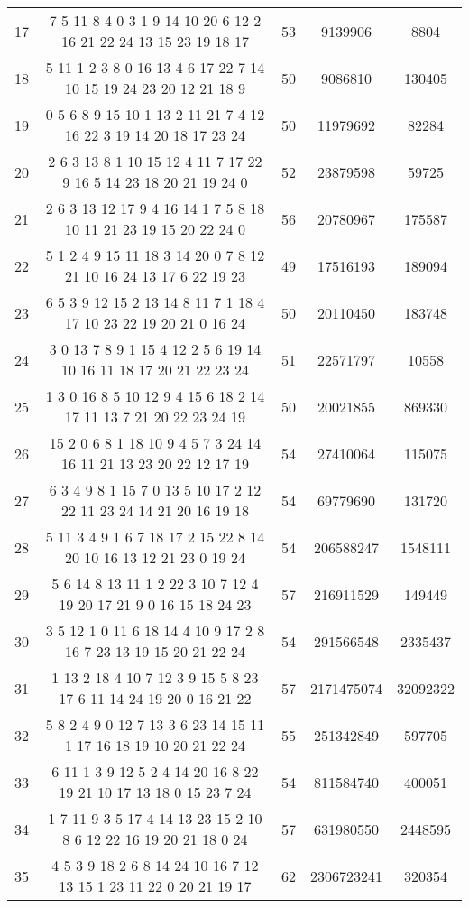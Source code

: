 \documentclass[a4paper,11pt,oneside,openany]{jsbook}
\begin{document}
\begin{table}[]
{\begin{tabular}{|c|c|c|c|c|}
17 & 7 5 11 8 4 0 3 1 9 14 10 20 6 12 2 16 21 22 24 13 15 23 19 18 17  & 53 & 9139906 & 8804 \\
18 & 5 11 1 2 3 8 0 16 13 4 6 17 22 7 14 10 15 19 24 23 20 12 21 18 9  & 50 & 9086810 & 130405 \\
19 & 0 5 6 8 9 15 10 1 13 2 11 21 7 4 12 16 22 3 19 14 20 18 17 23 24  & 50 & 11979692 & 82284 \\
20 & 2 6 3 13 8 1 10 15 12 4 11 7 17 22 9 16 5 14 23 18 20 21 19 24 0  & 52 & 23879598 & 59725 \\
21 & 2 6 3 13 12 17 9 4 16 14 1 7 5 8 18 10 11 21 23 19 15 20 22 24 0  & 56 & 20780967 & 175587 \\
22 & 5 1 2 4 9 15 11 18 3 14 20 0 7 8 12 21 10 16 24 13 17 6 22 19 23  & 49 & 17516193 & 189094 \\
23 & 6 5 3 9 12 15 2 13 14 8 11 7 1 18 4 17 10 23 22 19 20 21 0 16 24  & 50 & 20110450 & 183748 \\
24 & 3 0 13 7 8 9 1 15 4 12 2 5 6 19 14 10 16 11 18 17 20 21 22 23 24  & 51 & 22571797 & 10558 \\
25 & 1 3 0 16 8 5 10 12 9 4 15 6 18 2 14 17 11 13 7 21 20 22 23 24 19  & 50 & 20021855 & 869330 \\
26 & 15 2 0 6 8 1 18 10 9 4 5 7 3 24 14 16 11 21 13 23 20 22 12 17 19  & 54 & 27410064 & 115075 \\
27 & 6 3 4 9 8 1 15 7 0 13 5 10 17 2 12 22 11 23 24 14 21 20 16 19 18  & 54 & 69779690 & 131720 \\
28 & 5 11 3 4 9 1 6 7 18 17 2 15 22 8 14 20 10 16 13 12 21 23 0 19 24  & 54 & 206588247 & 1548111 \\
29 & 5 6 14 8 13 11 1 2 22 3 10 7 12 4 19 20 17 21 9 0 16 15 18 24 23  & 57 & 216911529 & 149449 \\
30 & 3 5 12 1 0 11 6 18 14 4 10 9 17 2 8 16 7 23 13 19 15 20 21 22 24  & 54 & 291566548 & 2335437 \\
31 & 1 13 2 18 4 10 7 12 3 9 15 5 8 23 17 6 11 14 24 19 20 0 16 21 22  & 57 & 2171475074 & 32092322 \\
32 & 5 8 2 4 9 0 12 7 13 3 6 23 14 15 11 1 17 16 18 19 10 20 21 22 24  & 55 & 251342849 & 597705 \\
33 & 6 11 1 3 9 12 5 2 4 14 20 16 8 22 19 21 10 17 13 18 0 15 23 7 24  & 54 & 811584740 & 400051 \\
34 & 1 7 11 9 3 5 17 4 14 13 23 15 2 10 8 6 12 22 16 19 20 21 18 0 24  & 57 & 631980550 & 2448595 \\
35 & 4 5 3 9 18 2 6 8 14 24 10 16 7 12 13 15 1 23 11 22 0 20 21 19 17  & 62 & 2306723241 & 320354 \\

\end{tabular}}
\end{table}
\end{document}
